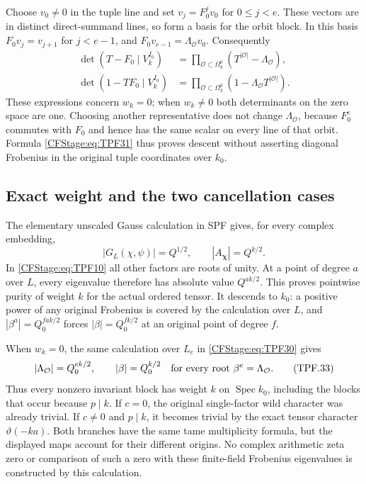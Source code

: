 Choose \(v_0\ne0\) in the tuple line and set
\(v_j=F_0^jv_0\) for \(0\le j<e\).
These vectors are in distinct direct-summand lines,
so form a basis for the orbit block. In this
basis \(F_0v_j=v_{j+1}\) for \(j<e-1\), and
\(F_0v_{e-1}=\Lambda_{\mathcal O}v_0\).
Consequently
\[
 \boxed{\begin{aligned}
 \det(T-F_0\mid V_k^{I_0})
    &=\prod_{\mathcal O\subset\Omega_k^0}
                              (T^{|\mathcal O|}-\Lambda_{\mathcal O}),\\
 \det(1-TF_0\mid V_k^{I_0})
    &=\prod_{\mathcal O\subset\Omega_k^0}
                              (1-\Lambda_{\mathcal O}T^{|\mathcal O|}).
 \end{aligned}}
 \tag{TPF.31}\label{CFStage:eq:TPF31}
\]
These expressions concern \(w_k=0\); when \(w_k\ne0\)
both determinants on the zero space are one.
Choosing another representative does not change
\(\Lambda_{\mathcal O}\), because \(F_0^e\) commutes
with \(F_0\) and hence has the same scalar on every
line of that orbit. Formula \eqref{CFStage:eq:TPF31} thus
proves descent without asserting diagonal
Frobenius in the original tuple coordinates over
\(k_0\).

\subsection{Exact weight and the two cancellation cases}

The elementary unscaled Gauss calculation in SPF
gives, for every complex embedding,
\[
 |G_L(\chi,\psi)|=Q^{1/2},\qquad
 |A_{\boldsymbol\chi}|=Q^{k/2}.
 \tag{TPF.32}\label{CFStage:eq:TPF32}
\]
In \eqref{CFStage:eq:TPF10} all other factors are roots of
unity. At a point of degree \(a\) over \(L\), every
eigenvalue therefore has absolute value \(Q^{ak/2}\).
This proves pointwise purity of weight \(k\) for
the actual ordered tensor. It descends to \(k_0\):
a positive power of any original Frobenius is
covered by the calculation over \(L\), and
\(|\beta^a|=Q_0^{fak/2}\) forces
\(|\beta|=Q_0^{fk/2}\) at an original point of
degree \(f\).

When \(w_k=0\), the same calculation over \(L_e\)
in \eqref{CFStage:eq:TPF30} gives
\[
 |\Lambda_{\mathcal O}|=Q_0^{ek/2},\qquad
 |\beta|=Q_0^{k/2}
       \quad\hbox{for every root }\beta^e=\Lambda_{\mathcal O}.
 \tag{TPF.33}\label{CFStage:eq:TPF33}
\]
Thus every nonzero invariant block has weight
\(k\) on \(\operatorname{Spec}k_0\), including the
blocks that occur because \(p\mid k\).
If \(c=0\), the original single-factor wild
character was already trivial. If \(c\ne0\) and
\(p\mid k\), it becomes trivial by the exact
tensor character \(\vartheta(-ka)\).
Both branches have the same tame multiplicity
formula, but the displayed maps account for
their different origins. No complex arithmetic
zeta zero or comparison of such a zero with these
finite-field Frobenius eigenvalues is constructed
by this calculation.

